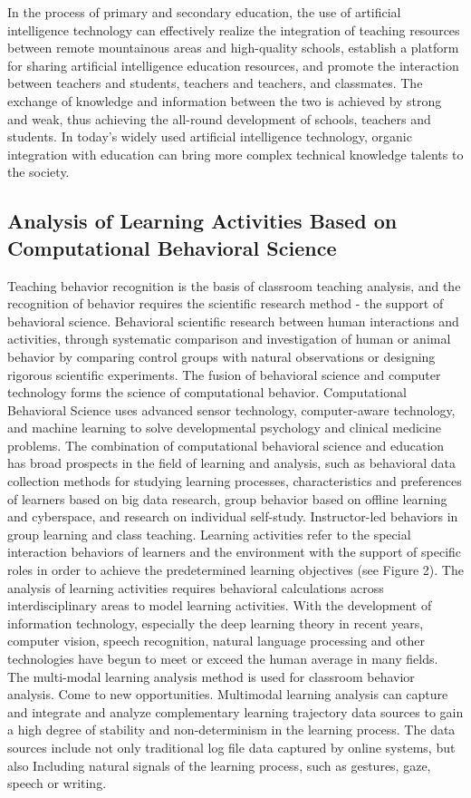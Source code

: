 \documentclass[11pt,en,authoryear]{elegantpaper}
\begin{document}
In the process of primary and secondary education, the use of artificial intelligence technology can effectively realize the integration of teaching resources between remote mountainous areas and high-quality schools, establish a platform for sharing artificial intelligence education resources, and promote the interaction between teachers and students, teachers and teachers, and classmates. The exchange of knowledge and information between the two is achieved by strong and weak, thus achieving the all-round development of schools, teachers and students. In today's widely used artificial intelligence technology, organic integration with education can bring more complex technical knowledge talents to the society.


\subsection{Analysis of Learning Activities Based on Computational Behavioral Science}
Teaching behavior recognition is the basis of classroom teaching analysis, and the recognition of behavior requires the scientific research method - the support of behavioral science. Behavioral scientific research between human interactions and activities, through systematic comparison and investigation of human or animal behavior by comparing control groups with natural observations or designing rigorous scientific experiments. The fusion of behavioral science and computer technology forms the science of computational behavior. Computational Behavioral Science uses advanced sensor technology, computer-aware technology, and machine learning to solve developmental psychology and clinical medicine problems.
The combination of computational behavioral science and education has broad prospects in the field of learning and analysis, such as behavioral data collection methods for studying learning processes, characteristics and preferences of learners based on big data research, group behavior based on offline learning and cyberspace, and research on individual self-study. Instructor-led behaviors in group learning and class teaching. Learning activities refer to the special interaction behaviors of learners and the environment with the support of specific roles in order to achieve the predetermined learning objectives (see Figure 2). The analysis of learning activities requires behavioral calculations across interdisciplinary areas to model learning activities.
With the development of information technology, especially the deep learning theory in recent years, computer vision, speech recognition, natural language processing and other technologies have begun to meet or exceed the human average in many fields. The multi-modal learning analysis method is used for classroom behavior analysis. Come to new opportunities. Multimodal learning analysis can capture and integrate and analyze complementary learning trajectory data sources to gain a high degree of stability and non-determinism in the learning process. The data sources include not only traditional log file data captured by online systems, but also Including natural signals of the learning process, such as gestures, gaze, speech or writing.
\end{document}
